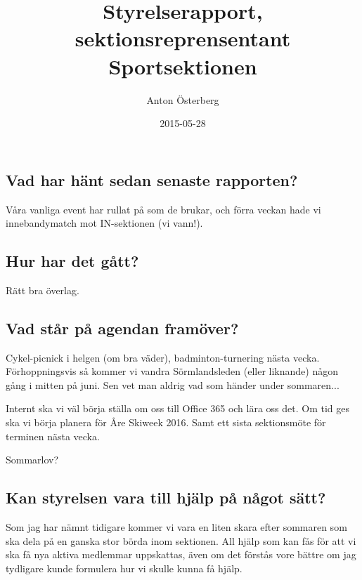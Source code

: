 \documentclass[a4paper]{article}
\begin{document}
	\title{\Huge Styrelserapport, sektionsreprensentant Sportsektionen}
	\author{Anton Österberg}
	\date{2015-05-28}
	\maketitle

	\null
	\vfill

	\clearpage

	\subsection{Vad har hänt sedan senaste rapporten?}
	Våra vanliga event har rullat på som de brukar, och förra veckan hade vi innebandymatch mot IN-sektionen (vi vann!).
	\subsection{Hur har det gått?}
	Rätt bra överlag.
	\subsection{Vad står på agendan framöver?}
	Cykel-picnick i helgen (om bra väder), badminton-turnering nästa vecka. Förhoppningsvis så kommer vi vandra Sörmlandsleden (eller liknande) någon gång i mitten på juni. Sen vet man aldrig vad som händer under sommaren...

	Internt ska vi väl börja ställa om oss till Office 365 och lära oss det. Om tid ges ska vi börja planera för Åre Skiweek 2016. Samt ett sista sektionsmöte för terminen nästa vecka.

	Sommarlov?
	\subsection{Kan styrelsen vara till hjälp på något sätt?}
	Som jag har nämnt tidigare kommer vi vara en liten skara efter sommaren som ska dela på en ganska stor börda inom sektionen. All hjälp som kan fås för att vi ska få nya aktiva medlemmar uppskattas, även om det förstås vore bättre om jag tydligare kunde formulera hur vi skulle kunna få hjälp.
\end{document}
